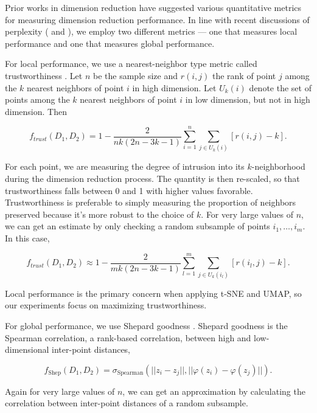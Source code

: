 \documentclass[10pt,letterpaper]{article}
\begin{document}
Prior works in dimension reduction have suggested various quantitative metrics for measuring dimension reduction performance. In line with recent discussions of perplexity (\cite{t-SNE cell} and \cite{large DR unreliable}), we employ two different metrics --- one that measures local performance and one that measures global performance.

For local performance, we use a nearest-neighbor type metric called trustworthiness \cite{trustworthiness}. Let $n$ be the sample size and $r(i,j)$ the rank of point $j$ among the $k$ nearest neighbors of point $i$ in high dimension. Let $U_k(i)$ denote the set of points among the $k$ nearest neighbors of point $i$ in low dimension, but not in high dimension. Then \begin{linenomath}$$f_{trust}(D_1, D_2) = 1 - \frac{2}{nk(2n - 3k - 1)}\sum_{i=1}^n \sum_{j \in U_k(i)} \left[ r(i,j) - k \right].$$\end{linenomath} For each point, we are measuring the degree of intrusion into its $k$-neighborhood during the dimension reduction process. The quantity is then re-scaled, so that trustworthiness falls between 0 and 1 with higher values favorable. Trustworthiness is preferable to simply measuring the proportion of neighbors preserved because it's more robust to the choice of $k$. For very large values of $n$, we can get an estimate by only checking a random subsample of points $i_1, \hdots, i_m$. In this case, \begin{linenomath}$$f_{trust}(D_1, D_2) \approx 1 - \frac{2}{mk(2n - 3k - 1)}\sum_{l=1}^m \sum_{j \in U_k(i_l)} \left[ r(i_l,j) - k \right].$$\end{linenomath} Local performance is the primary concern when applying t-SNE and UMAP, so our experiments focus on maximizing trustworthiness.

For global performance, we use Shepard goodness \cite{quantitative survey}. Shepard goodness is the Spearman correlation, a rank-based correlation, between high and low-dimensional inter-point distances, \begin{linenomath}$$f_\textrm{Shep}(D_1, D_2) = \sigma_\textrm{Spearman}(||z_i - z_j||, ||\varphi(z_i) - \varphi(z_j)||).$$\end{linenomath} Again for very large values of $n$, we can get an approximation by calculating the correlation between inter-point distances of a random subsample.
\end{document}

